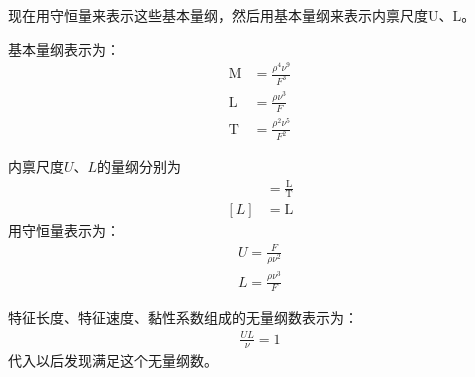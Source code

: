 现在用守恒量来表示这些基本量纲，然后用基本量纲来表示内禀尺度$\mathrm{U}$、$\mathrm{L}$。

基本量纲表示为：
\begin{align}
    \mathrm{M}&=\frac{\rho^{4}\nu^{9}}{F^{3}}\\
    \mathrm{L}&=\frac{\rho\nu^{3}}{F}\\
    \mathrm{T}&=\frac{\rho^{2}\nu^{5}}{F^{2}}
\end{align}

内禀尺度$U$、$L$的量纲分别为
\begin{align}
    [U]&=\frac{\mathrm{L}}{\mathrm{T}}\\
    [L]&=\mathrm{L}
\end{align}
用守恒量表示为：
\begin{align}
    U=\frac{F}{\rho\nu^{2}}\\
    L=\frac{\rho\nu^{3}}{F}
\end{align}

特征长度、特征速度、黏性系数组成的无量纲数表示为：
\begin{align}
    \frac{UL}{\nu}=1
\end{align}
代入以后发现满足这个无量纲数。